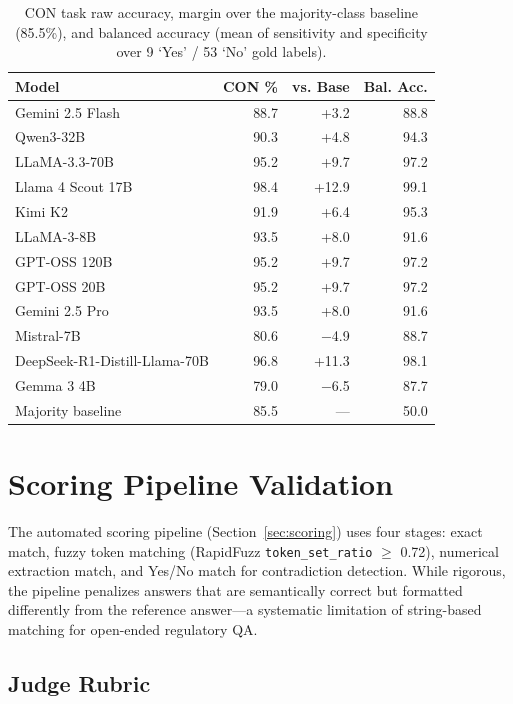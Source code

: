 \begin{table}[t]
\centering\small
\begin{tabular}{lrrr}
\toprule
\textbf{Model} & \textbf{CON \%} & \textbf{vs. Base} & \textbf{Bal. Acc.} \\
\midrule
Gemini 2.5 Flash & 88.7 & +3.2 & 88.8 \\
Qwen3-32B & 90.3 & +4.8 & 94.3 \\
LLaMA-3.3-70B & 95.2 & +9.7 & 97.2 \\
Llama 4 Scout 17B & 98.4 & +12.9 & 99.1 \\
Kimi K2 & 91.9 & +6.4 & 95.3 \\
LLaMA-3-8B & 93.5 & +8.0 & 91.6 \\
GPT-OSS 120B & 95.2 & +9.7 & 97.2 \\
GPT-OSS 20B & 95.2 & +9.7 & 97.2 \\
Gemini 2.5 Pro & 93.5 & +8.0 & 91.6 \\
Mistral-7B & 80.6 & $-$4.9 & 88.7 \\
DeepSeek-R1-Distill-Llama-70B & 96.8 & +11.3 & 98.1 \\
Gemma 3 4B & 79.0 & $-$6.5 & 87.7 \\
\midrule
Majority baseline & 85.5 & --- & 50.0 \\
\bottomrule
\end{tabular}
\caption{CON task raw accuracy, margin over the majority-class baseline (85.5\%), and balanced accuracy (mean of sensitivity and specificity over 9 `Yes' / 53 `No' gold labels).}
\label{tab:c1}
\end{table}

\section{Scoring Pipeline Validation}
\label{app:judge}

The automated scoring pipeline (Section~\ref{sec:scoring}) uses four stages: exact match, fuzzy token matching (RapidFuzz \texttt{token\_set\_ratio} $\geq$ 0.72), numerical extraction match, and Yes/No match for contradiction detection. While rigorous, the pipeline penalizes answers that are semantically correct but formatted differently from the reference answer---a systematic limitation of string-based matching for open-ended regulatory QA.

\subsection{Judge Rubric}

